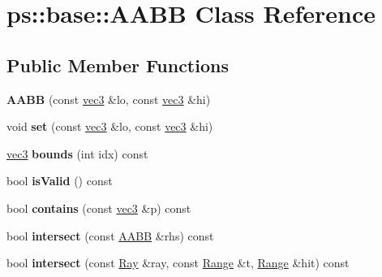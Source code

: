 \hypertarget{classps_1_1base_1_1AABB}{}\section{ps\+:\+:base\+:\+:A\+A\+B\+B Class Reference}
\label{classps_1_1base_1_1AABB}
\subsection*{Public Member Functions}
\begin{DoxyCompactItemize}
\item 
\hypertarget{classps_1_1base_1_1AABB_a4abe0e2a95ad2c3b12457cc9b0f83239}{}{\bfseries A\+A\+B\+B} (const \hyperlink{classps_1_1base_1_1Vec3}{vec3} \&lo, const \hyperlink{classps_1_1base_1_1Vec3}{vec3} \&hi)\label{classps_1_1base_1_1AABB_a4abe0e2a95ad2c3b12457cc9b0f83239}

\item 
\hypertarget{classps_1_1base_1_1AABB_a3c29d0908f8e0de2bb0c940abd1ad597}{}void {\bfseries set} (const \hyperlink{classps_1_1base_1_1Vec3}{vec3} \&lo, const \hyperlink{classps_1_1base_1_1Vec3}{vec3} \&hi)\label{classps_1_1base_1_1AABB_a3c29d0908f8e0de2bb0c940abd1ad597}

\item 
\hypertarget{classps_1_1base_1_1AABB_a1283f56b8991b9c9b0f106f7799e75f7}{}\hyperlink{classps_1_1base_1_1Vec3}{vec3} {\bfseries bounds} (int idx) const \label{classps_1_1base_1_1AABB_a1283f56b8991b9c9b0f106f7799e75f7}

\item 
\hypertarget{classps_1_1base_1_1AABB_ab5e504286a222c6fb8b9b13a74b1054c}{}bool {\bfseries is\+Valid} () const \label{classps_1_1base_1_1AABB_ab5e504286a222c6fb8b9b13a74b1054c}

\item 
\hypertarget{classps_1_1base_1_1AABB_a05a4bfffe188d066d5e873b3103e7c0e}{}bool {\bfseries contains} (const \hyperlink{classps_1_1base_1_1Vec3}{vec3} \&p) const \label{classps_1_1base_1_1AABB_a05a4bfffe188d066d5e873b3103e7c0e}

\item 
\hypertarget{classps_1_1base_1_1AABB_a72dd61c8c70df720936068b99e2f20ab}{}bool {\bfseries intersect} (const \hyperlink{classps_1_1base_1_1AABB}{A\+A\+B\+B} \&rhs) const \label{classps_1_1base_1_1AABB_a72dd61c8c70df720936068b99e2f20ab}

\item 
\hypertarget{classps_1_1base_1_1AABB_addf7a0a3a1e808b00da21ed2ca05ca21}{}bool {\bfseries intersect} (const \hyperlink{classps_1_1base_1_1Ray}{Ray} \&ray, const \hyperlink{classps_1_1base_1_1Interval}{Range} \&t, \hyperlink{classps_1_1base_1_1Interval}{Range} \&hit) const \label{classps_1_1base_1_1AABB_addf7a0a3a1e808b00da21ed2ca05ca21}


\end{DoxyCompactItemize}
